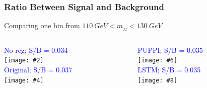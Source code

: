 \documentclass{beamer}
\newcommand{\backupend}{
  \addtocounter{framenumbervorappendix}{-\value{framenumber}}
  \addtocounter{framenumber}{\value{framenumbervorappendix}}
}
\newcommand{\fourfigs}[8]{
  \begin{columns}
    \begin{column}{0.3\linewidth}
      \centering
      \textcolor{blue}{#1} \\
      \texttt{[image: \#2]} \\
      \textcolor{blue}{#3} \\
      \texttt{[image: \#4]}
    \end{column}
    \begin{column}{0.3\linewidth}
      \centering
      \textcolor{blue}{#5} \\
      \texttt{[image: \#6]} \\
      \textcolor{blue}{#7} \\
      \texttt{[image: \#8]}
    \end{column}
  \end{columns}
}
\begin{document}
\begin{frame}
  \frametitle{Ratio Between Signal and Background}

  Comparing one bin from $\SI{110}{GeV} < m_{jj} < \SI{130}{GeV}$

  \fourfigs{\scriptsize{No reg; S/B = 0.034}}
           {190813_ratio/signal_hbb_m.pdf}
           {\scriptsize{Original; S/B = 0.037}}
           {190813_ratio/signal_hbb_m_190723_origin.pdf}
           {\scriptsize{PUPPI; S/B = 0.035}}
           {190813_ratio/signal_hbb_m_190723_puppi.pdf}
           {\scriptsize{LSTM; S/B = 0.035}}
           {190813_ratio/signal_hbb_m_190725_lstm_pf.pdf}

\end{frame}



\backupend
\end{document}
